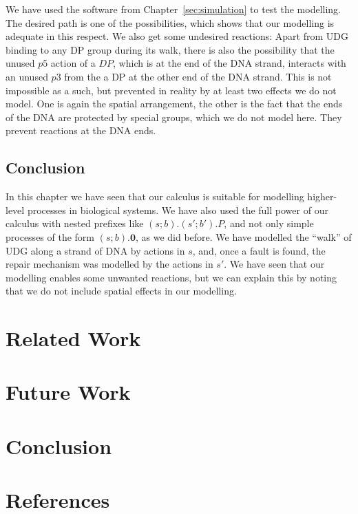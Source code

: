 \documentclass[review]{elsarticle}
\newcommand{\Nil}{\mathbf{0}}
\begin{document}
We have used the software from Chapter~\ref{sec:simulation} to test the modelling. The desired path is one of the possibilities, which shows that our modelling is adequate in this respect. We also get some undesired reactions: Apart from UDG binding to any DP group during its walk, there is also the possibility that the unused $p5$ action of a $DP$, which is at the end of the DNA strand, interacts with an unused $p3$ from the a DP at the other end of the DNA strand. This is not impossible as a such, but prevented in reality by at least two effects we do not model. One is again the spatial arrangement, the other is the fact that the ends of the DNA are protected by special groups, which we do not model here. They prevent reactions at the DNA ends.

\subsection{Conclusion}

In this chapter we have seen that our calculus is suitable for modelling higher-level processes in biological systems. We have also used the full power of our calculus with nested prefixes like $(s;b).(s';b').P$, and not only simple processes of the form $(s;b).\Nil$, as we did before. We have modelled the ``walk'' of UDG along 
a strand of DNA by actions in $s$, and, once a fault is found, the repair mechanism was modelled
by the actions in $s'$. We have seen that our modelling enables some unwanted reactions, but we can explain this by noting that we do not include spatial effects in our modelling.

\section{Related Work}

\section{Future Work}

\section{Conclusion}

\section*{References}


\end{document}
